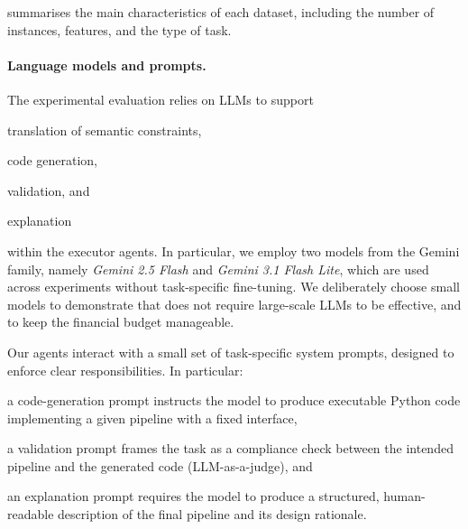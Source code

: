 \documentclass[runningheads]{llncs}
\begin{document}
%
%
%
%
 summarises the main characteristics of each dataset, including the number of instances, features, and the type of task.

\paragraph{Language models and prompts.}
%
The experimental evaluation relies on \acp{LLM} to support
\begin{inlinelist}
    \item translation of semantic constraints,
    \item code generation,
    \item validation, and
    \item explanation
\end{inlinelist}
within the executor agents.
%
In particular,
we employ two models from the Gemini family,
namely \textit{Gemini 2.5 Flash} and \textit{Gemini 3.1 Flash Lite},
which are used across experiments without task-specific fine-tuning.
%
We deliberately choose small models to demonstrate that \ourapproach{} does not require large-scale \acp{LLM} to be effective,
and to keep the financial budget manageable.

Our agents interact with a small set of task-specific system prompts,
designed to enforce clear responsibilities.
%
In particular:
\begin{inlinelist}
  \item a code-generation prompt instructs the model to produce executable Python code implementing a given pipeline with a fixed interface,
  \item a validation prompt frames the task as a compliance check between the intended pipeline and the generated code (\ac{LLM}-as-a-judge), and
  \item an explanation prompt requires the model to produce a structured,
human-readable description of the final pipeline and its design rationale.
\end{inlinelist}
\end{document}
